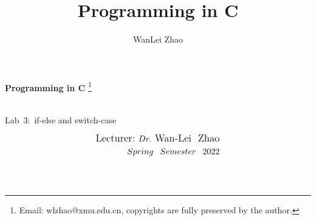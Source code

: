 \documentclass[t]{beamer}
\title{Programming in C}
\author{WanLei Zhao}
\newcommand\blfootnote[1]{
  \begingroup
  \renewcommand\thefootnote{}\footnote{#1}
  \addtocounter{footnote}{-1}
  \endgroup
}
\begin{document}
\begin{frame}
   \begin{center}
    \vspace{24pt}
    \Huge\textbf{Programming in C}\blfootnote{Email: wlzhao@xmu.edu.cn, copyrights are fully preserved by the author.}\\
     \Huge{\mbox{Lab 3: }if-else and switch-case}
    \vspace{36pt}
  \end{center}
  \begin{align*}
   \vspace{18pt}
      \large{\mbox{Lecturer:}~Dr.~\mbox{Wan-Lei~~Zhao}} \\
      \large{Spring~~Semester~~2022} \\
   \vspace{30pt}
  \end{align*}
\end{frame}



\section{}
\end{document}

